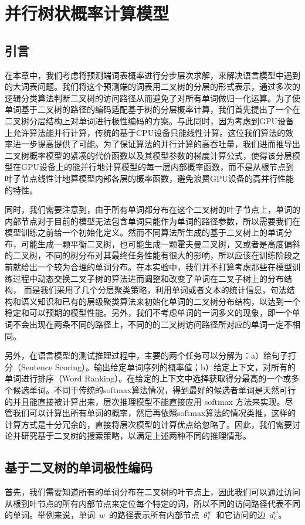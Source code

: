 \chapter{并行树状概率计算模型}
\section{引言}
在本章中，我们考虑将预测端词表概率进行分步层次求解，来解决语言模型中遇到的大词表问题。我们将这个预测端的词表用二叉树的分层的形式表示，通过多次的逻辑分类算法判断二叉树的访问路径从而避免了对所有单词做归一化运算。为了使单词基于二叉树的路径的编码适配基于树的分层概率计算，我们首先提出了一个在二叉树分层结构上对单词进行极性编码的方案。与此同时，因为考虑到GPU设备上允许算法能并行计算，传统的基于CPU设备只能线性计算。这位我们算法的效率进一步提高提供了可能。为了保证算法的并行计算的高吞吐量，我们进而推导出二叉树概率模型的紧凑的代价函数以及其模型参数的梯度计算公式，使得该分层模型在GPU设备上的能并行地计算模型的每一层内部概率函数，而不是从根节点到叶子节点线性计地算模型内部各层的概率函数，避免浪费GPU设备的高并行性能的特性。

同时，我们需要注意到，由于所有单词都分布在这个二叉树的叶子节点上，单词的内部节点对于目前的模型无法包含单词只能作为单词的路径参数，所以需要我们在模型训练之前给一个初始化定义。然而不同算法所生成的基于二叉树上的单词分布，可能生成一颗平衡二叉树，也可能生成一颗霍夫曼二叉树，又或者是高度偏斜的二叉树，不同的树分布对其最终任务性能有很大的影响，所以应该在训练阶段之前就给出一个较为合理的单词分布。在本实验中，我们并不打算考虑那些在模型训练过程中动态交换二叉子树的算法进而调整和改变了单词在二叉子树上的分布结构， 而是我们采用了几个分层聚类策略，利用单词或者文本的统计信息，句法结构和语义知识和已有的层级聚类算法来初始化单词的二叉树分布结构，以达到一个稳定和可以预期的模型性能。另外，我们不考虑单词的一词多义的现象，即一个单词不会出现在两条不同的路径上，不同的的二叉树访问路径所对应的单词一定不相同。

另外，在语言模型的测试推理过程中，主要的两个任务可以分解为：a）给句子打分（Sentence Scoring）。输出给定单词序列的概率值；b）给定上下文，对所有的单词进行排序（Word Ranking）。在给定的上下文中选择获取得分最高的一个或多个候选单词。不同于传统的softmax算法情况，得到最好的候选者单词是天然可行的并且能直接被计算出来，层次推理模型不能直接应用 softmax 方法来实现。尽管我们可以计算出所有单词的概率，然后再依照softmax算法的情况类推，这样的计算方式是十分冗余的，直接将层次模型的计算优点给忽略了。因此，我们需要讨论并研究基于二叉树的搜索策略，以满足上述两种不同的推理情形。
\section{基于二叉树的单词极性编码}
首先，我们需要知道所有的单词分布在二叉树的叶节点上，因此我们可以通过访问从根到叶节点的所有内部节点来定位每个特定的词，所以不同的访问路径代表不同的单词。举例来说，单词~$w$~的路径表示所有内部节点~$\theta^w_i$~和它访问的边~$d^w_i$。

